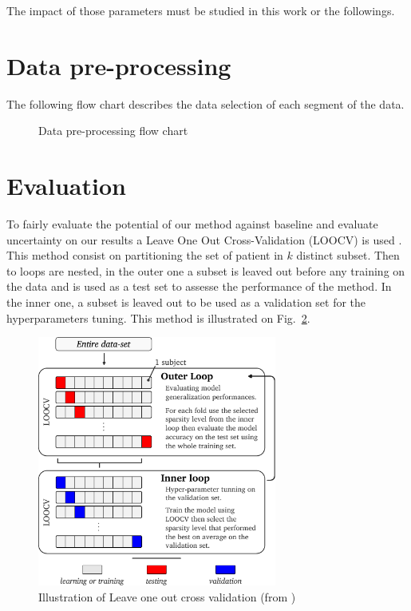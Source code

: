 \documentclass[a4paper,12pt]{article}
\begin{document}
The impact of those parameters must be studied in this work or the followings.

\section{Data pre-processing}

The following flow chart describes the data selection of each segment of the data. 

\begin{figure}[h]
    \centering
    
    \caption{Data pre-processing flow chart}
    \label{fig:preprocessing}
\end{figure}



\section{Evaluation}

To fairly evaluate the potential of our method against baseline and evaluate uncertainty on our results a Leave One Out Cross-Validation (LOOCV) is used \cite{meghnoudjSparseOptimalControlbased2024}. This method consist on partitioning the set of patient in $k$ distinct subset. Then to loops are nested, in the outer one a subset is leaved out before any training on the data and is used as a test set to assesse the performance of the method. In the inner one, a subset is leaved out to be used as a validation set for the hyperparameters tuning. This method is illustrated on Fig.~\ref{fig:loocv}.

\begin{figure}
    \centering
    \includegraphics[width=0.7\textwidth]{figures/chap_1_NLOO.pdf}
    \caption{Illustration of Leave one out cross validation (from \cite{meghnoudjSparseOptimalControlbased2024})}
    \label{fig:loocv}
\end{figure}
\end{document}

